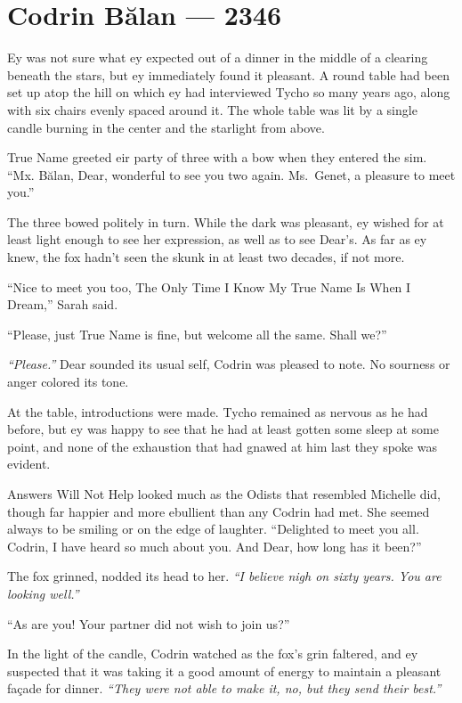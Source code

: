 \hypertarget{codrin-bux103lan-2346}{%
\chapter{Codrin Bălan — 2346}\label{codrin-bux103lan-2346}}

Ey was not sure what ey expected out of a dinner in the middle of a clearing beneath the stars, but ey immediately found it pleasant. A round table had been set up atop the hill on which ey had interviewed Tycho so many years ago, along with six chairs evenly spaced around it. The whole table was lit by a single candle burning in the center and the starlight from above.

True Name greeted eir party of three with a bow when they entered the sim. ``Mx. Bălan, Dear, wonderful to see you two again. Ms.~Genet, a pleasure to meet you.''

The three bowed politely in turn. While the dark was pleasant, ey wished for at least light enough to see her expression, as well as to see Dear's. As far as ey knew, the fox hadn't seen the skunk in at least two decades, if not more.

``Nice to meet you too, The Only Time I Know My True Name Is When I Dream,'' Sarah said.

``Please, just True Name is fine, but welcome all the same. Shall we?''

\emph{``Please.''} Dear sounded its usual self, Codrin was pleased to note. No sourness or anger colored its tone.

At the table, introductions were made. Tycho remained as nervous as he had before, but ey was happy to see that he had at least gotten some sleep at some point, and none of the exhaustion that had gnawed at him last they spoke was evident.

Answers Will Not Help looked much as the Odists that resembled Michelle did, though far happier and more ebullient than any Codrin had met. She seemed always to be smiling or on the edge of laughter. ``Delighted to meet you all. Codrin, I have heard so much about you. And Dear, how long has it been?''

The fox grinned, nodded its head to her. \emph{``I believe nigh on sixty years. You are looking well.''}

``As are you! Your partner did not wish to join us?''

In the light of the candle, Codrin watched as the fox's grin faltered, and ey suspected that it was taking it a good amount of energy to maintain a pleasant façade for dinner. \emph{``They were not able to make it, no, but they send their best.''}

